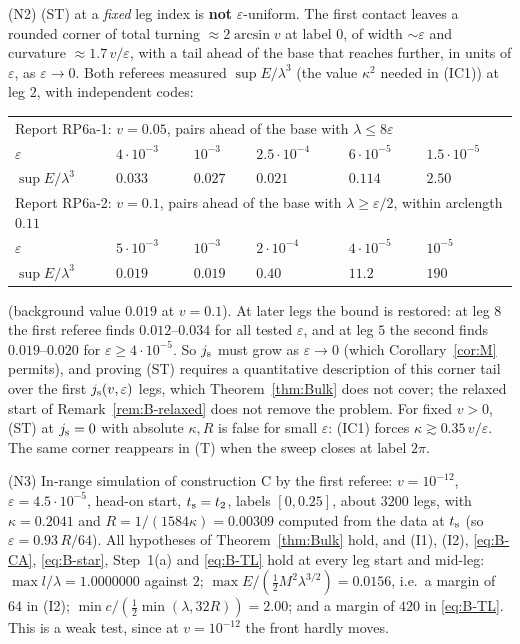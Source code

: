 \begin{remark}[Status]
(N2) \textup{(ST)} at a \emph{fixed} leg index is \textbf{not} $\varepsilon$-uniform. The first contact leaves a rounded corner of
total turning $\approx2\arcsin v$ at label $0$, of width $\sim\varepsilon$ and curvature $\approx1.7\,v/\varepsilon$, with a tail ahead
of the base that reaches further, in units of $\varepsilon$, as $\varepsilon\to0$. Both referees measured $\sup E/\lambda^3$ (the
value $\kappa^2$ needed in (IC1)) at leg $2$, with independent codes:
\begin{center}
\begin{tabular}{llllll}
\toprule
\multicolumn{6}{l}{Report RP6a-1: $v=0.05$, pairs ahead of the base with $\lambda\le8\varepsilon$}\\
$\varepsilon$ & $4\cdot10^{-3}$ & $10^{-3}$ & $2.5\cdot10^{-4}$ & $6\cdot10^{-5}$ & $1.5\cdot10^{-5}$\\
$\sup E/\lambda^3$ & $0.033$ & $0.027$ & $0.021$ & $0.114$ & $2.50$\\
\midrule
\multicolumn{6}{l}{Report RP6a-2: $v=0.1$, pairs ahead of the base with $\lambda\ge\varepsilon/2$, within arclength $0.11$}\\
$\varepsilon$ & $5\cdot10^{-3}$ & $10^{-3}$ & $2\cdot10^{-4}$ & $4\cdot10^{-5}$ & $10^{-5}$\\
$\sup E/\lambda^3$ & $0.019$ & $0.019$ & $0.40$ & $11.2$ & $190$\\
\bottomrule
\end{tabular}
\end{center}
(background value $0.019$ at $v=0.1$). At later legs the bound is restored: at leg $8$ the first referee
finds $0.012$--$0.034$ for all tested $\varepsilon$, and at leg $5$ the second finds $0.019$--$0.020$ for $\varepsilon\ge4\cdot10^{-5}$. So
$j_{\mathrm s}$ must grow as $\varepsilon\to0$ (which Corollary~\ref{cor:M} permits), and proving \textup{(ST)} requires a quantitative
description of this corner tail over the first $j_{\mathrm s}(v,\varepsilon)$ legs, which Theorem~\ref{thm:Bulk} does not cover; the relaxed
start of Remark~\ref{rem:B-relaxed} does not remove the problem. For fixed $v>0$, \textup{(ST)} at $j_{\mathrm s}=0$ with absolute $\kappa,R$
is false for small $\varepsilon$: (IC1) forces $\kappa\gtrsim0.35\,v/\varepsilon$. The same corner reappears in \textup{(T)} when the
sweep closes at label $2\pi$.

(N3) In-range simulation of construction C by the first referee: $v=10^{-12}$, $\varepsilon=4.5\cdot10^{-5}$, head-on start,
$t_{\mathrm s}=t_2$, labels $[0,0.25]$, about $3200$ legs, with $\kappa=0.2041$ and $R=1/(1584\kappa)=0.00309$ computed from the data at
$t_{\mathrm s}$ (so $\varepsilon=0.93\,R/64$). All hypotheses of Theorem~\ref{thm:Bulk} hold, and (I1), (I2), \eqref{eq:B-CA},
\eqref{eq:B-star}, Step~1(a) and \eqref{eq:B-TL} hold at every leg start and mid-leg: $\max l/\lambda=1.0000000$ against $2$;
$\max E/(\frac12M^2\lambda^{3/2})=0.0156$, i.e.\ a margin of $64$ in (I2); $\min c/(\frac12\min(\lambda,32R))=2.00$; and a margin of $420$
in \eqref{eq:B-TL}. This is a weak test, since at $v=10^{-12}$ the front hardly moves.
\end{remark}
